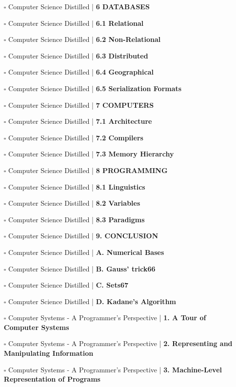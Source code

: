 \documentclass[a4, landscape, 12pt]{article}
\newcommand{\checkbox}{$\square$}%
\begin{document}
\begin{itemize}
{}
\item [\checkbox]  Computer Science Distilled | \textbf{ 6 DATABASES
}
\item [\checkbox]  Computer Science Distilled | \textbf{ 6.1 Relational
}
\item [\checkbox]  Computer Science Distilled | \textbf{ 6.2 Non-Relational
}
\item [\checkbox]  Computer Science Distilled | \textbf{ 6.3 Distributed
}
\item [\checkbox]  Computer Science Distilled | \textbf{ 6.4 Geographical
}
\item [\checkbox]  Computer Science Distilled | \textbf{ 6.5 Serialization Formats
}
\item [\checkbox]  Computer Science Distilled | \textbf{ 7 COMPUTERS
}
\item [\checkbox]  Computer Science Distilled | \textbf{ 7.1 Architecture
}
\item [\checkbox]  Computer Science Distilled | \textbf{ 7.2 Compilers
}
\item [\checkbox]  Computer Science Distilled | \textbf{ 7.3 Memory Hierarchy
}
\item [\checkbox]  Computer Science Distilled | \textbf{ 8 PROGRAMMING
}
\item [\checkbox]  Computer Science Distilled | \textbf{ 8.1 Linguistics
}
\item [\checkbox]  Computer Science Distilled | \textbf{ 8.2 Variables
}
\item [\checkbox]  Computer Science Distilled | \textbf{ 8.3 Paradigms
}
\item [\checkbox]  Computer Science Distilled | \textbf{ 9. CONCLUSION
}
\item [\checkbox]  Computer Science Distilled | \textbf{ A. Numerical Bases
}
\item [\checkbox]  Computer Science Distilled | \textbf{ B. Gauss’ trick66
}
\item [\checkbox]  Computer Science Distilled | \textbf{ C. Sets67
}
\item [\checkbox]  Computer Science Distilled | \textbf{ D. Kadane’s Algorithm
}
\item [\checkbox]  Computer Systems - A Programmer's Perspective  | \textbf{ 1. A Tour of Computer Systems
}
\item [\checkbox]  Computer Systems - A Programmer's Perspective  | \textbf{ 2. Representing and Manipulating Information
}
\item [\checkbox]  Computer Systems - A Programmer's Perspective  | \textbf{ 3. Machine-Level Representation of Programs
}
\end{itemize}
\end{document}
